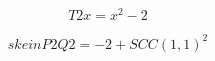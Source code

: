 \documentclass[letterpaper, 10pt]{extarticle}
\begin{document}
\begin{dmath*}
T2x =
    x^{2} - 2
\end{dmath*}


\begin{dmath*}
skeinP2Q2 =
    -2 + SCC(1, 1)^{2}
\end{dmath*}
\end{document}
